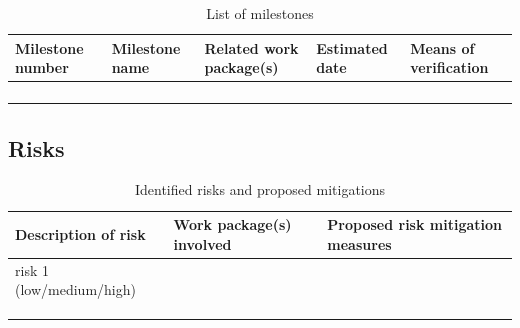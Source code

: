 \documentclass[11pt,a4paper]{report}
\begin{document}
\begin{table}[!htbp]
\caption{List of milestones}
\centering
\begin{tabular}{@{}lllll@{}}
\toprule
\textbf{Milestone number} & \textbf{Milestone name} & \textbf{Related work package(s)} & \textbf{Estimated date} & \textbf{Means of verification} \\ \midrule
                          &                         &                                  &                         &                                \\
                          &                         &                                  &                         &                                \\
                          &                         &                                  &                         &                                \\
                          &                         &                                  &                         &                                \\ \bottomrule
\end{tabular}
\end{table}


\subsection{Risks}\label{risks}

\begin{table}[!htbp]
\caption{Identified risks and proposed mitigations}
\centering
\begin{tabular}{@{}lll@{}}
\toprule
\textbf{Description of risk} & \textbf{Work package(s) involved} & \textbf{Proposed risk mitigation measures} \\ \midrule
risk 1 (low/medium/high)     &                                   &                                            \\
                             &                                   &                                            \\
                             &                                   &                                            \\
                             &                                   &                                            \\ \bottomrule
\end{tabular}
\end{table}
\end{document}
